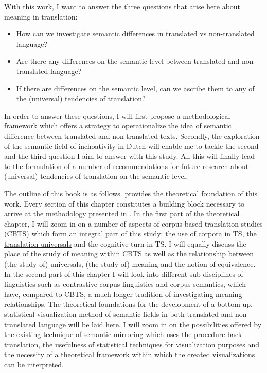 With this work, I want to answer the three questions that arise here about meaning in translation:


\begin{itemize}
\item 
How can we investigate semantic differences in translated vs non-translated language?
\item 
Are there any differences on the semantic level between translated and non-translated language? 
\item 
If there are differences on the semantic level, can we ascribe them to any of the (universal) tendencies of translation?
\end{itemize}

In order to answer these questions, I will first propose a methodological framework which offers a strategy to operationalize the idea of semantic difference between translated and non-translated texts. Secondly, the exploration of the semantic field of inchoativity in Dutch will enable me to tackle the second and the third question I aim to answer with this study. All this will finally lead to the formulation of a number of recommendations for future research about (universal) tendencies of translation on the semantic level.



The outline of this book is as follows. \hyperlink{Chapter2Theoretical}{} provides the theoretical foundation of this work. Every section of this chapter constitutes a building block necessary to arrive at the methodology presented in \hyperlink{Chapter3Methodology}{}. In the first part of the theoretical chapter, I will zoom in on a number of aspects of corpus-based translation studies (CBTS) which form an integral part of this study: the \hyperlink{Corpora}{use of corpora in TS}, the \hyperlink{Bakersuniversals}{translation universals} and the cognitive turn in TS. I will equally discuss the place of the study of meaning within CBTS as well as the relationship between (the study of) universals, (the study of) meaning and the notion of equivalence. In the second part of this chapter I will look into different sub-disciplines of linguistics such as contrastive corpus linguistics and corpus semantics, which have, compared to CBTS, a much longer tradition of investigating meaning relationships. The theoretical foundations for the development of a bottom-up, statistical visualization method of semantic fields in both translated and non-translated language will be laid here. I will zoom in on the possibilities offered by the existing technique of semantic mirroring which uses the procedure back-translation, the usefulness of statistical techniques for visualization purposes and the necessity of a theoretical framework within which the created visualizations can be interpreted.



